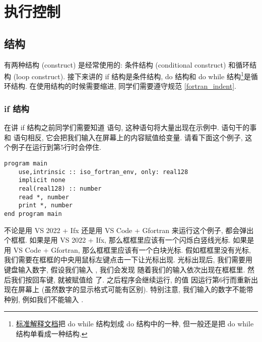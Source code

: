 \chapter{执行控制}

\section{结构}

有两种结构 (construct) 是经常使用的: 条件结构 (conditional construct) 和循环结构 (loop construct). 接下来讲的 if 结构是条件结构, do 结构和 do while 结构\footnote{\href{https://j3-fortran.org/doc/year/24/24-007.pdf}{标准解释文档}把 do while 结构划成 do 结构中的一种, 但一般还是把 do while 结构单看成一种结构.}是循环结构. 在使用结构的时候需要缩进, 同学们需要遵守规范 \ref{fortran_indent}.

\subsection{if 结构}\label{if_construct}

在讲 if 结构之前同学们需要知道  语句, 这种语句将大量出现在示例中.  语句干的事和  语句相反, 它会把我们输入在屏幕上的内容赋值给变量. 请看下面这个例子, 这个例子在运行到第5行时会停住.
\begin{lstlisting}
program main
    use,intrinsic :: iso_fortran_env, only: real128
    implicit none
    real(real128) :: number
    read *, number
    print *, number
end program main
\end{lstlisting}
不论是用 VS 2022 + Ifx 还是用 VS Code + Gfortran 来运行这个例子, 都会弹出个框框. 如果是用 VS 2022 + Ifx, 那么框框里应该有一个闪烁白竖线光标. 如果是用 VS Code + Gfortran, 那么框框里应该有一个白块光标. 假如框框里没有光标, 我们需要在框框的中央用鼠标左键点击一下让光标出现. 光标出现后, 我们需要用键盘输入数字, 假设我们输入 , 我们会发现  随着我们的输入依次出现在框框里. 然后我们按回车键,  就被赋值给  了. 之后程序会继续运行,  的值  因运行第6行而重新出现在屏幕上 (虽然数字的显示格式可能有区别). 特别注意, 我们输入的数字不能带种别, 例如我们不能输入 .

